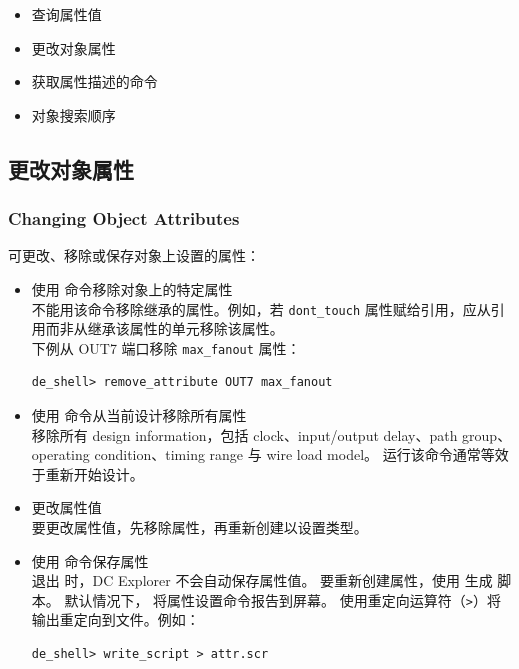 \begin{seeAlsoBox}
\begin{itemize}
  \item 查询属性值
  \item 更改对象属性
  \item 获取属性描述的命令
  \item 对象搜索顺序
\end{itemize}
\end{seeAlsoBox}

\subsection{更改对象属性}
\subsubsection*{Changing Object Attributes}

可更改、移除或保存对象上设置的属性：
\begin{itemize}
  \item 使用  命令移除对象上的特定属性\\
        不能用该命令移除继承的属性。例如，若 \texttt{dont\_touch} 属性赋给引用，应从引用而非从继承该属性的单元移除该属性。\\
        下例从 OUT7 端口移除 \texttt{max\_fanout} 属性：
\begin{lstlisting}
de_shell> remove_attribute OUT7 max_fanout
\end{lstlisting}
  \item 使用  命令从当前设计移除所有属性\\
 移除所有 design information，包括 clock、input/output delay、path group、operating condition、timing range 与 wire load model。
        运行该命令通常等效于重新开始设计。
  \item 更改属性值\\
        要更改属性值，先移除属性，再重新创建以设置类型。
  \item 使用  命令保存属性\\
        退出  时，DC Explorer 不会自动保存属性值。
        要重新创建属性，使用  生成  脚本。
        默认情况下， 将属性设置命令报告到屏幕。
        使用重定向运算符（\texttt{>}）将输出重定向到文件。例如：
\begin{lstlisting}
de_shell> write_script > attr.scr
\end{lstlisting}
\end{itemize}

